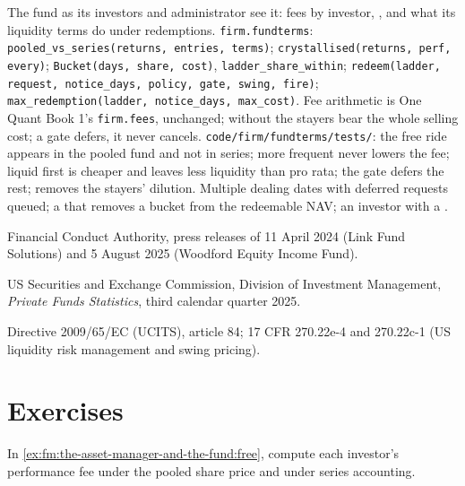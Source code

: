 \begin{build}
 The fund as its investors and administrator see it: fees by investor, , and what its liquidity terms do under
redemptions.
 \texttt{firm.fundterms}: \texttt{pooled\_vs\_series(returns, entries, terms)}; \texttt{crystallised(returns, perf, every)};
\texttt{Bucket(days, share, cost)}, \texttt{ladder\_share\_within}; \texttt{redeem(ladder, request, notice\_days, policy, gate, swing, fire)};
\texttt{max\_redemption(ladder, notice\_days, max\_cost)}.
 Fee arithmetic is One Quant Book 1's \texttt{firm.fees}, unchanged; without  the stayers bear the whole selling cost;
a gate defers, it never cancels.
 \texttt{code/firm/fundterms/tests/}: the free ride appears in the pooled fund and not in series; more frequent
 never lowers the fee; liquid first is cheaper and leaves less liquidity than pro rata; the gate defers the rest; 
removes the stayers' dilution.
 Multiple dealing dates with deferred requests queued; a  that removes a bucket from the redeemable NAV; an investor
with a .
\end{build}

\begin{omsources}
\item Financial Conduct Authority, press releases of 11 April 2024 (Link Fund Solutions) and 5 August 2025 (Woodford Equity Income Fund).
\item US Securities and Exchange Commission, Division of Investment Management, \emph{Private Funds Statistics}, third calendar quarter 2025.
\item Directive 2009/65/EC (UCITS), article 84; 17 CFR 270.22e-4 and 270.22c-1 (US liquidity risk management and swing pricing).
\end{omsources}

\section{Exercises}

\begin{exercise}[$\star$]\label{exo:fm:the-asset-manager-and-the-fund:1}
In \cref{ex:fm:the-asset-manager-and-the-fund:free}, compute each investor's performance fee under the pooled share price and under series
accounting.
\end{exercise}

